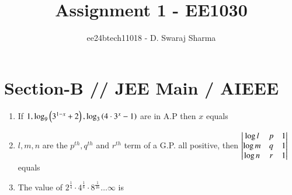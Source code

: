 \documentclass[journal,12pt,twocolumn]{IEEEtran}
\theoremstyle{remark}
\begin{document}

\vspace{3cm}

\title{Assignment 1 - EE1030}
\author{ee24btech11018 - D. Swaraj Sharma}
\maketitle
\newpage
\bigskip

\renewcommand{\thefigure}{\theenumi}
\renewcommand{\thetable}{\theenumi}

\section{\textbf{Section-B} // \textbf{JEE Main} / \textbf{AIEEE}}

\begin{enumerate}[label={\arabic*.}]


\item {If $ 1, \log_9 \left(3^{1-x} +2\right), \log_3 \left(4\cdot3^x -1\right)$ are in A.P then $x$ equals}
{\hfill{}}
\begin{enumerate}
\end{enumerate}
\item {$l, m, n$ are the $p^{th}, q^{th}$ and $r^{th}$ term of a G.P. all positive, then $\begin{vmatrix}\log l & p & 1 \\ \log m & q & 1 \\ \log n & r & 1 \end{vmatrix}$ equals}
{\hfill{}} 
\begin{enumerate}
\end{enumerate}

\item {The value of $2^{\frac{1}{4}}\cdot 4^{\frac{1}{8}}\cdot 8^{\frac{1}{16}} \ldots \infty$ is}
{\hfill{}} 
\begin{enumerate}
\end{enumerate}


\end{enumerate}
\end{document}
